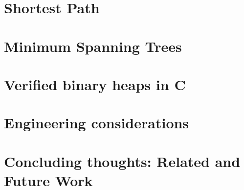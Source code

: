 \documentclass[runningheads]{llncs}
\newcommand\hide[1]{}
\begin{document}
\vspace*{-0.5em}
	\section{Shortest Path}
	\label{sec:dijkstra}
\vspace*{-0.5em}
	
	
\vspace*{-0.5em}
    \section{Minimum Spanning Trees}
    \label{sec:mst}
\vspace*{-0.5em}
	
	

\vspace*{-0.5em}
    \section{Verified binary heaps in C}
    \label{sec:binheap}
\vspace*{-0.5em}
    

	
\vspace*{-0.5em}
    \section{Engineering considerations}
    \label{sec:stats}
\vspace*{-0.5em}
	

%	

\vspace*{-0.5em}
	\section{Concluding thoughts: Related and Future Work}
	\label{sec:conclusion}
\vspace*{-0.5em}


	

	
	

\hide{	\appendix
	\label{sec:apx}
	
	}
	
\end{document}
